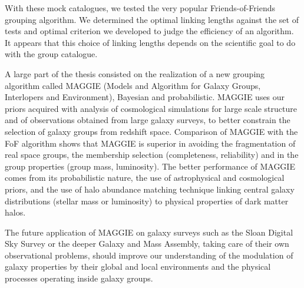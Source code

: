 \begin{bartabstract}
    With these mock catalogues, we tested the very popular Friends-of-Friends
    grouping algorithm. We determined the optimal linking lengths against the
    set of tests and optimal criterion we developed to judge the efficiency of
    an algorithm. It appears that this choice of linking lengths depends on the
    scientific goal to do with the group catalogue.

    A large part of the thesis consisted on the realization of a new grouping
    algorithm called MAGGIE (Models and Algorithm for Galaxy Groups,
    Interlopers and Environment), Bayesian and probabilistic. MAGGIE uses our
    priors acquired with analysis of cosmological simulations for large scale
    structure and of observations obtained from large galaxy surveys, to better
    constrain the selection of galaxy groups from redshift space. Comparison of
    MAGGIE with the FoF algorithm shows that MAGGIE is superior in avoiding the
    fragmentation of real space groups, the membership selection (completeness,
    reliability) and in the group properties (group mass, luminosity). The
    better performance of MAGGIE comes from its probabilistic nature, the use
    of astrophysical and cosmological priors, and the use of halo abundance
    matching technique linking central galaxy distributions (stellar mass or
    luminosity) to physical properties of dark matter halos.

    The future application of MAGGIE on galaxy surveys such as the Sloan
    Digital Sky Survey or the deeper Galaxy and Mass Assembly, taking care of
    their own observational problems, should improve our understanding of the
    modulation of galaxy properties by their global and local environments and
    the physical processes operating inside galaxy groups.

\end{bartabstract}

